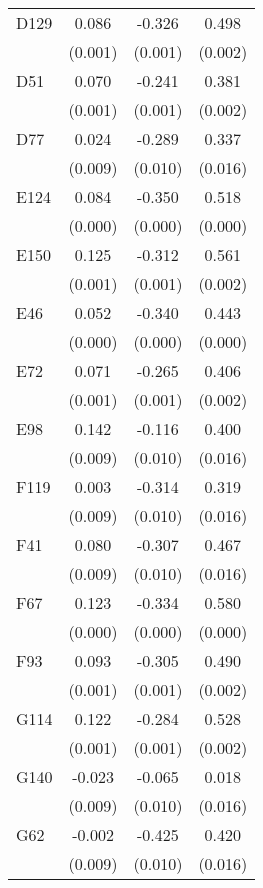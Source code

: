 \begin{table}[htbp]
\begin{tabular}{l*{3}{c}}
D129            &    0.086&   -0.326&    0.498\\
                &  (0.001)&  (0.001)&  (0.002)\\
D51             &    0.070&   -0.241&    0.381\\
                &  (0.001)&  (0.001)&  (0.002)\\
D77             &    0.024&   -0.289&    0.337\\
                &  (0.009)&  (0.010)&  (0.016)\\
E124            &    0.084&   -0.350&    0.518\\
                &  (0.000)&  (0.000)&  (0.000)\\
E150            &    0.125&   -0.312&    0.561\\
                &  (0.001)&  (0.001)&  (0.002)\\
E46             &    0.052&   -0.340&    0.443\\
                &  (0.000)&  (0.000)&  (0.000)\\
E72             &    0.071&   -0.265&    0.406\\
                &  (0.001)&  (0.001)&  (0.002)\\
E98             &    0.142&   -0.116&    0.400\\
                &  (0.009)&  (0.010)&  (0.016)\\
F119            &    0.003&   -0.314&    0.319\\
                &  (0.009)&  (0.010)&  (0.016)\\
F41             &    0.080&   -0.307&    0.467\\
                &  (0.009)&  (0.010)&  (0.016)\\
F67             &    0.123&   -0.334&    0.580\\
                &  (0.000)&  (0.000)&  (0.000)\\
F93             &    0.093&   -0.305&    0.490\\
                &  (0.001)&  (0.001)&  (0.002)\\
G114            &    0.122&   -0.284&    0.528\\
                &  (0.001)&  (0.001)&  (0.002)\\
G140            &   -0.023&   -0.065&    0.018\\
                &  (0.009)&  (0.010)&  (0.016)\\
G62             &   -0.002&   -0.425&    0.420\\
                &  (0.009)&  (0.010)&  (0.016)\\

\end{tabular}
\end{table}
